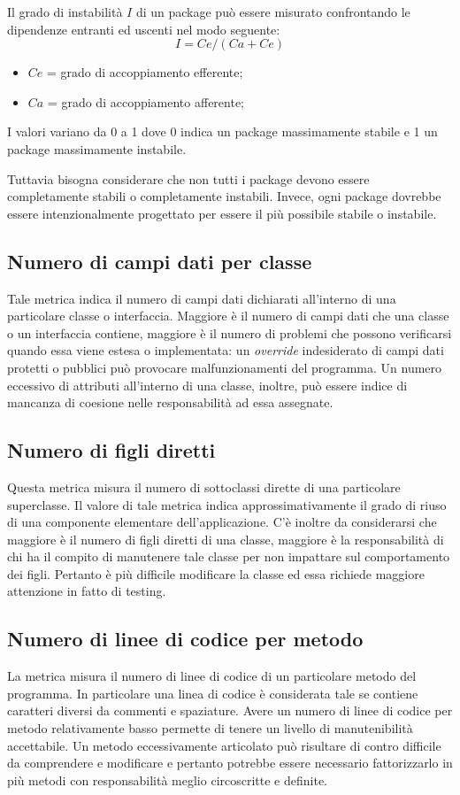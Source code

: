 Il grado di instabilità $I$ di un package può essere misurato confrontando le dipendenze entranti ed uscenti nel modo seguente:	
\begin{equation}
	I = Ce/(Ca + Ce) 
\end{equation}
\begin{itemize}
	\item $Ce$ = grado di accoppiamento efferente;
	\item $Ca$ = grado di accoppiamento afferente;
\end{itemize}
I valori variano da 0 a 1 dove 0 indica un package massimamente stabile e 1 un package massimamente instabile.

Tuttavia bisogna considerare che non tutti i package devono essere completamente stabili o completamente instabili. Invece, ogni package dovrebbe essere intenzionalmente progettato per essere il più possibile stabile o instabile.
	
\subsection{Numero di campi dati per classe}
Tale metrica indica il numero di campi dati dichiarati all'interno di una particolare classe o interfaccia. Maggiore è il numero di campi dati che una classe o un interfaccia contiene, maggiore è il numero di problemi che possono verificarsi quando essa viene estesa o implementata: un \emph{override} indesiderato di campi dati protetti o pubblici può provocare malfunzionamenti del programma. Un numero eccessivo di attributi all'interno di una classe, inoltre, può essere indice di mancanza di coesione nelle responsabilità ad essa assegnate.

\subsection{Numero di figli diretti}
Questa metrica misura il numero di sottoclassi dirette di una particolare superclasse. Il valore di tale metrica indica approssimativamente il grado di riuso di una componente elementare dell'applicazione. C'è inoltre da considerarsi che maggiore è il numero di figli diretti di una classe, maggiore è la responsabilità di chi ha il compito di manutenere tale classe per non impattare sul comportamento dei figli. Pertanto è più difficile modificare la classe ed essa richiede maggiore attenzione in fatto di testing.

\subsection{Numero di linee di codice per metodo}
La metrica misura il numero di linee di codice di un particolare metodo del programma. In particolare una linea di codice è considerata tale se contiene caratteri diversi da commenti e spaziature. Avere un numero di linee di codice per metodo relativamente basso permette di tenere un livello di manutenibilità accettabile. Un metodo eccessivamente articolato può risultare di contro difficile da comprendere e modificare e pertanto potrebbe essere necessario fattorizzarlo in più metodi con responsabilità meglio circoscritte e definite.

